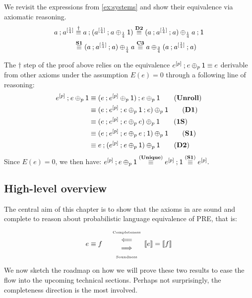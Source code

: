 \begin{example} We revisit the expressions from \cref{ex:systems} and show their equivalence via axiomatic reasoning.
\begin{align*}
     a \mathbin{;} a^{[\frac{1}{4}]} &\stackrel\dagger\equiv   a \mathbin{;} (a^{[\frac{1}{4}]} \mathbin{;} a \oplus_{\frac{1}{4}} \mathsf{1}) \stackrel{\textbf{D2}}\equiv  (a \mathbin{;} a^{[\frac{1}{4}]}\mathbin{;} a) \oplus_{\frac{1}{4}} a \mathbin{;} \mathsf{1}\\  &\stackrel{\textbf{S1}}\equiv (a \mathbin{;} a^{[\frac{1}{4}]}\mathbin{;} a) \oplus_{\frac{1}{4}} a \stackrel{\textbf{C3}}\equiv a \oplus_{\frac{3}{4}} (a \mathbin{;} a^{[\frac{1}{4}]}\mathbin{;} a)
\end{align*}

The $\dagger$ step of the proof above relies on the equivalence $e^{[p]}\mathbin{;} e \oplus_p \mathsf{1} \equiv e$ derivable from other axioms under the assumption $E(e)=0$ through a following line of reasoning:
\begin{align*}
    e^{[p]} \seq e \oplus_p \one  &\equiv (e \seq e^{[p]} \oplus_p \one)\seq e\oplus_p \one \tag{\textbf{Unroll}}\\
    &\equiv (e \seq e^{[p]}\seq e \oplus_p \one\seq e) \oplus_p \one \tag{\textbf{D1}}\\
    &\equiv (e \seq e^{[p]}\seq e \oplus_p e) \oplus_p \one \tag{\textbf{1S}}\\
        &\equiv (e \seq e^{[p]}\seq e \oplus_p e\seq \one) \oplus_p \one \tag{\textbf{S1}}\\
    &\equiv e \seq (e^{[p]}\seq e \oplus_p \one) \oplus_p \one \tag{\textbf{D2}}
\end{align*}
Since $E(e)=0$,  we then have: 
\(
     e^{[p]} \mathbin{;} e \oplus_p \mathsf{1} \stackrel{(\textbf{Unique})}\equiv e^{[p]}\mathbin{;} \mathsf{1} 
     \stackrel{(\textbf{S1})}\equiv e^{[p]} .
\)
\end{example}
\subsection{High-level overview}
The central aim of this chapter is to show that the axioms in  are sound and complete to reason about probabilistic language equivalence of {PRE}, that is:
\[
e \equiv f \quad \begin{array}{c} {\text{\tiny Completeness}} \\ \Longleftarrow\\ \Longrightarrow\\ {\text{\tiny Soundness}} \end{array} \llbracket e\rrbracket = \llbracket f\rrbracket
\]
We now sketch the roadmap on how we will prove these two results to ease the flow into the upcoming technical sections. Perhaps not surprisingly, the completeness direction is the most involved. 


